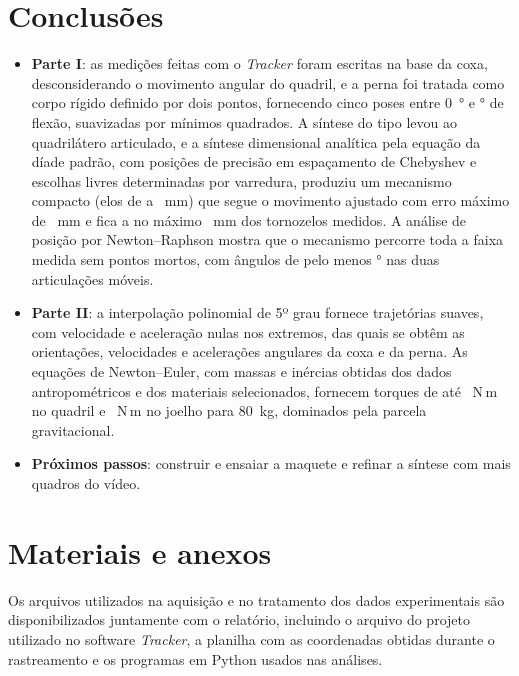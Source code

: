 \documentclass[12pt,a4paper,twoside]{article}
\numberwithin{equation}{section}
\begin{document}
\section{Conclusões}

\begin{itemize}
  \item \textbf{Parte I}: as medições feitas com o \emph{Tracker} foram escritas na base da
  coxa, desconsiderando o movimento angular do quadril, e a perna foi tratada como corpo
  rígido definido por dois pontos, fornecendo cinco poses entre \SI{0}{\degree} e
  \phiE\si{\degree} de flexão, suavizadas por mínimos quadrados. A síntese do tipo levou ao
  quadrilátero articulado, e a síntese dimensional analítica pela equação da díade padrão,
  com posições de precisão em espaçamento de Chebyshev e escolhas livres determinadas por
  varredura, produziu um mecanismo compacto (elos de \rminelo{} a \rmaxelo~mm) que segue o
  movimento ajustado com erro máximo de \ecurva~mm e fica a no máximo \emedmax~mm dos
  tornozelos medidos. A análise de posição por Newton--Raphson mostra que o mecanismo
  percorre toda a faixa medida sem pontos mortos, com ângulos de pelo menos
  \mumindois\si{\degree} nas duas articulações móveis.
  \item \textbf{Parte II}: a interpolação polinomial de 5º grau fornece trajetórias suaves,
  com velocidade e aceleração nulas nos extremos, das quais se obtêm as orientações,
  velocidades e acelerações angulares da coxa e da perna. As equações de Newton--Euler,
  com massas e inércias obtidas dos dados antropométricos e dos materiais selecionados,
  fornecem torques de até \tqIImax~N\,m no quadril e \tjImax~N\,m no joelho para
  \SI{80}{kg}, dominados pela parcela gravitacional.
  \item \textbf{Próximos passos}: construir e ensaiar a maquete e refinar a síntese com mais
  quadros do vídeo.
\end{itemize}

\section{Materiais e anexos}\label{sec:anexos}

Os arquivos utilizados na aquisição e no tratamento dos dados experimentais são
disponibilizados juntamente com o relatório, incluindo o arquivo do projeto utilizado
no software \emph{Tracker}, a planilha com as coordenadas obtidas durante o rastreamento
e os programas em Python usados nas análises.
\end{document}
